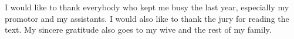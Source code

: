  \begin{preface}
 I would like to thank everybody who kept me busy the last year, especially my promotor and my assistants. I would also like to thank the jury for reading the text. My sincere gratitude also goes to my wive and the rest of my family.
 \end{preface}